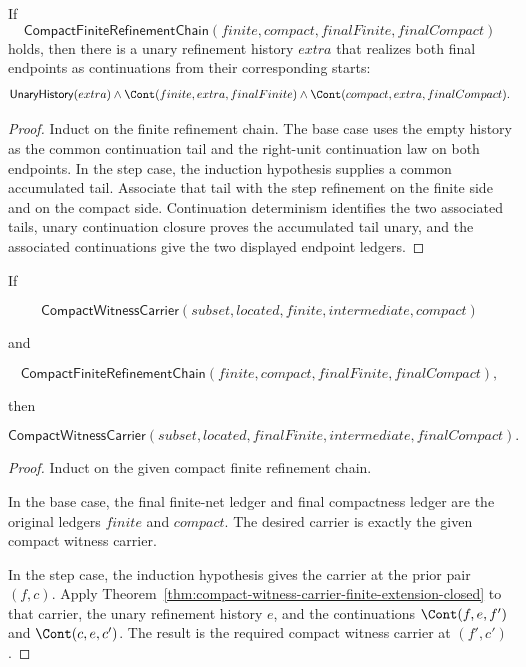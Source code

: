 \begin{theorem}
\label{thm:compact-finite-refinement-chain-continuation-witness}
If
$$
\mathsf{CompactFiniteRefinementChain}(finite,compact,finalFinite,finalCompact)
$$
holds, then there is a unary refinement history $extra$ that realizes both final
endpoints as continuations from their corresponding starts:
$$
\mathsf{UnaryHistory}(extra)\land
\Cont(finite,extra,finalFinite)\land
\Cont(compact,extra,finalCompact).
$$
\end{theorem}
\begin{proof}
Induct on the finite refinement chain. The base case uses the empty history as
the common continuation tail and the right-unit continuation law on both
endpoints. In the step case, the induction hypothesis supplies a common
accumulated tail. Associate that tail with the step refinement on the finite
side and on the compact side. Continuation determinism identifies the two
associated tails, unary continuation closure proves the accumulated tail unary,
and the associated continuations give the two displayed endpoint ledgers.
\end{proof}

\begin{theorem}
\label{thm:compact-witness-carrier-finite-refinement-chain-closed}
If

$$
\mathsf{CompactWitnessCarrier}(subset,located,finite,intermediate,compact)
$$

and

$$
\mathsf{CompactFiniteRefinementChain}(finite,compact,finalFinite,finalCompact),
$$

then

$$
\mathsf{CompactWitnessCarrier}(subset,located,finalFinite,intermediate,finalCompact).
$$

\end{theorem}
\begin{proof}
Induct on the given compact finite refinement chain.

In the base case, the final finite-net ledger and final compactness ledger are
the original ledgers $finite$ and $compact$. The desired carrier is exactly the
given compact witness carrier.

In the step case, the induction hypothesis gives the carrier at the prior pair
$(f,c)$. Apply
Theorem~\ref{thm:compact-witness-carrier-finite-extension-closed} to that
carrier, the unary refinement history $e$, and the continuations
$\Cont(f,e,f')$ and $\Cont(c,e,c')$. The result is the required compact witness
carrier at $(f',c')$.
\end{proof}

